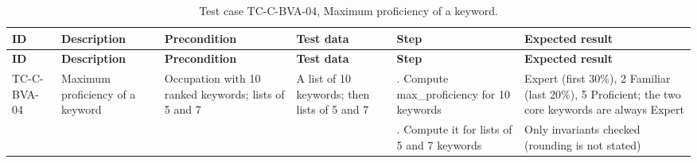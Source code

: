 {\footnotesize{}\renewcommand{\arraystretch}{1.1}
\begin{longtable}{|>{\raggedright\arraybackslash}p{}|>{\raggedright\arraybackslash}p{}|>{\raggedright\arraybackslash}p{}|>{\raggedright\arraybackslash}p{}|>{\raggedright\arraybackslash}p{}|>{\raggedright\arraybackslash}p{}|}
\caption{Test case TC-\allowbreak{}C-\allowbreak{}BVA-\allowbreak{}04, Maximum proficiency of a keyword.} \\
\hline
\textbf{ID} & \textbf{Description} & \textbf{Precondition} & \textbf{Test data} & \textbf{Step} & \textbf{Expected result} \\ \hline
\endfirsthead
\hline
\textbf{ID} & \textbf{Description} & \textbf{Precondition} & \textbf{Test data} & \textbf{Step} & \textbf{Expected result} \\ \hline
\endhead
TC-C-BVA-04 & Maximum proficiency of a keyword & Occupation with 10 ranked keywords; lists of 5 and 7 & A list of 10 keywords; then lists of 5 and 7 & 1. Compute max\_\allowbreak{}proficiency for 10 keywords & 3 Expert (first 30\%), 2 Familiar (last 20\%), 5 Proficient; the two core keywords are always Expert \\ \cline{5-6}
 &  &  &  & 2. Compute it for lists of 5 and 7 keywords & Only invariants checked (rounding is not stated) \\ \hline
\end{longtable}
}

